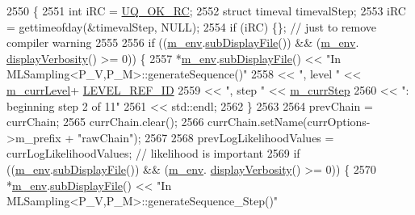 \begin{DoxyCode}
2550 \{
2551   \textcolor{keywordtype}{int} iRC = \hyperlink{namespace_q_u_e_s_o_a8e909502900aecf24cedba022ea84471}{UQ\_OK\_RC};
2552   \textcolor{keyword}{struct }timeval timevalStep;
2553   iRC = gettimeofday(&timevalStep, NULL);
2554   \textcolor{keywordflow}{if} (iRC) \{\}; \textcolor{comment}{// just to remove compiler warning}
2555 
2556       \textcolor{keywordflow}{if} ((\hyperlink{class_q_u_e_s_o_1_1_m_l_sampling_a13f1ca4fe9f94822fe572a743eaced1d}{m\_env}.\hyperlink{class_q_u_e_s_o_1_1_base_environment_a8a0064746ae8dddfece4229b9ad374d6}{subDisplayFile}()) && (\hyperlink{class_q_u_e_s_o_1_1_m_l_sampling_a13f1ca4fe9f94822fe572a743eaced1d}{m\_env}.
      \hyperlink{class_q_u_e_s_o_1_1_base_environment_a1fe5f244fc0316a0ab3e37463f108b96}{displayVerbosity}() >= 0)) \{
2557         *\hyperlink{class_q_u_e_s_o_1_1_m_l_sampling_a13f1ca4fe9f94822fe572a743eaced1d}{m\_env}.\hyperlink{class_q_u_e_s_o_1_1_base_environment_a8a0064746ae8dddfece4229b9ad374d6}{subDisplayFile}() << \textcolor{stringliteral}{"In MLSampling<P\_V,P\_M>::generateSequence()"}
2558                                 << \textcolor{stringliteral}{", level "} << \hyperlink{class_q_u_e_s_o_1_1_m_l_sampling_af9416874c856e50f3b35270e801f17e4}{m\_currLevel}+
      \hyperlink{_m_l_sampling_level_options_8h_a68d15eaf394d210effcf584b938206d3}{LEVEL\_REF\_ID}
2559                                 << \textcolor{stringliteral}{", step "}  << \hyperlink{class_q_u_e_s_o_1_1_m_l_sampling_a1b1f8ccb4823bdfa26ec652f0807c63e}{m\_currStep}
2560                                 << \textcolor{stringliteral}{": beginning step 2 of 11"}
2561                                 << std::endl;
2562       \}
2563 
2564       prevChain = currChain;
2565       currChain.clear();
2566       currChain.setName(currOptions->m\_prefix + \textcolor{stringliteral}{"rawChain"});
2567 
2568       prevLogLikelihoodValues = currLogLikelihoodValues; \textcolor{comment}{// likelihood is important}
2569       \textcolor{keywordflow}{if} ((\hyperlink{class_q_u_e_s_o_1_1_m_l_sampling_a13f1ca4fe9f94822fe572a743eaced1d}{m\_env}.\hyperlink{class_q_u_e_s_o_1_1_base_environment_a8a0064746ae8dddfece4229b9ad374d6}{subDisplayFile}()) && (\hyperlink{class_q_u_e_s_o_1_1_m_l_sampling_a13f1ca4fe9f94822fe572a743eaced1d}{m\_env}.
      \hyperlink{class_q_u_e_s_o_1_1_base_environment_a1fe5f244fc0316a0ab3e37463f108b96}{displayVerbosity}() >= 0)) \{
2570         *\hyperlink{class_q_u_e_s_o_1_1_m_l_sampling_a13f1ca4fe9f94822fe572a743eaced1d}{m\_env}.\hyperlink{class_q_u_e_s_o_1_1_base_environment_a8a0064746ae8dddfece4229b9ad374d6}{subDisplayFile}() << \textcolor{stringliteral}{"In MLSampling<P\_V,P\_M>::generateSequence\_Step()"}

\end{DoxyCode}
